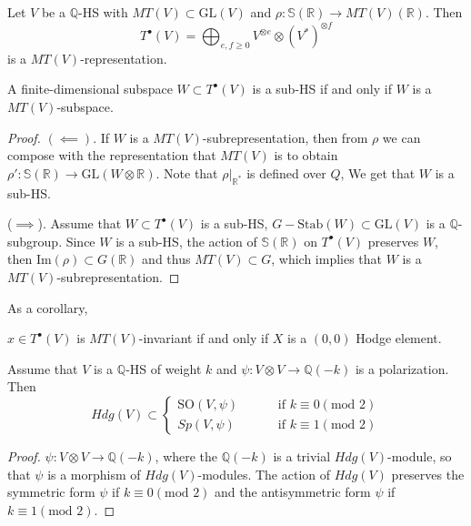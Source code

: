 \noindent
Let $V$ be a $\mathbb{Q}$-HS with $MT(V)
\subset \text{GL}(V)$
and $\rho:\mathbb{S}(\mathbb{R}) \to
MT(V)(\mathbb{R})$.
Then
$$
T^\bullet(V)=\bigoplus_{e,f \geq 0}
V^{\otimes e}\otimes (V^* )^{\otimes f}
$$
is a $MT(V)$-representation.

\begin{proposition}
\label{proposition-sub-HS-iff}
A finite-dimensional subspace $W \subset
T^\bullet(V)$
is a sub-HS if and only if $W$ is
a $MT(V)$-subspace.
\end{proposition}

\begin{proof}
$(\impliedby)$. If $W$ is a
$MT(V)$-subrepresentation,
then from $\rho$ we can compose with the
representation that $MT(V)$ is
to obtain
$\rho':\mathbb{S}(\mathbb{R}) \to \text{GL}(W
\otimes \mathbb{R})$.
Note that $\rho|_{\mathbb{R}^*}$ is defined
over $Q$,
We get that $W$ is a sub-HS.

($\implies$). Assume that $W \subset
T^\bullet(V)$
is a sub-HS, $G - \text{Stab}(W) \subset
\text{GL}(V)$
is a $\mathbb{Q}$-subgroup.
Since $W$ is a sub-HS,
the action of $\mathbb{S}(\mathbb{R})$ on
$T^\bullet(V)$
preserves $W$,
then $\text{Im}(\rho) \subset G(\mathbb{R})$
and thus $MT(V)\subset G$,
which implies that $W$ is a
$MT(V)$-subrepresentation.
\end{proof}


As a corollary,

\begin{corollary}
\label{lemma-mumford-tate-invariant-iff}
$x \in T^\bullet(V)$ is $MT(V)$-invariant
if and only if $X$ is a $(0,0)$ Hodge
element.
\end{corollary}

\begin{proposition}
\label{proposition-}
Assume that $V$ is a $\mathbb{Q}$-HS of
weight $k$
and $\psi:V \otimes V \to \mathbb{Q}(-k)$ is
a polarization.
Then
$$
Hdg(V) \subset
\begin{cases}
\text{SO}(V,\psi)\qquad &\text{ if }k\equiv
0(\text{mod }2) \\
Sp(V,\psi)\qquad &\text{ if }k \equiv
1(\text{mod }2)
\end{cases}
$$
\end{proposition}

\begin{proof}
$\psi: V \otimes V \to \mathbb{Q}(-k)$,
where the $\mathbb{Q}(-k)$ is a trivial
$Hdg(V)$-module,
so that $\psi$ is a morphism of
$Hdg(V)$-modules.
The action of $Hdg(V)$ preserves the
symmetric form
$\psi$ if $k \equiv 0 (\text{mod }2)$
and the antisymmetric form $\psi$
if $k \equiv 1 (\text{mod }2)$.
\end{proof}

